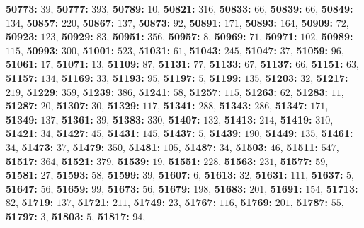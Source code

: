 \textsf{\bfseries 50773:} $39$, \textsf{\bfseries 50777:} $393$, \textsf{\bfseries 50789:} $10$, \textsf{\bfseries 50821:} $316$, \textsf{\bfseries 50833:} $66$, \textsf{\bfseries 50839:} $66$, \textsf{\bfseries 50849:} $134$, \textsf{\bfseries 50857:} $220$, \textsf{\bfseries 50867:} $137$, \textsf{\bfseries 50873:} $92$, \textsf{\bfseries 50891:} $171$, \textsf{\bfseries 50893:} $164$, \textsf{\bfseries 50909:} $72$, \textsf{\bfseries 50923:} $123$, \textsf{\bfseries 50929:} $83$, \textsf{\bfseries 50951:} $356$, \textsf{\bfseries 50957:} $8$, \textsf{\bfseries 50969:} $71$, \textsf{\bfseries 50971:} $102$, \textsf{\bfseries 50989:} $115$, \textsf{\bfseries 50993:} $300$, \textsf{\bfseries 51001:} $523$, \textsf{\bfseries 51031:} $61$, \textsf{\bfseries 51043:} $245$, \textsf{\bfseries 51047:} $37$, \textsf{\bfseries 51059:} $96$, \textsf{\bfseries 51061:} $17$, \textsf{\bfseries 51071:} $13$, \textsf{\bfseries 51109:} $87$, \textsf{\bfseries 51131:} $77$, \textsf{\bfseries 51133:} $67$, \textsf{\bfseries 51137:} $66$, \textsf{\bfseries 51151:} $63$, \textsf{\bfseries 51157:} $134$, \textsf{\bfseries 51169:} $33$, \textsf{\bfseries 51193:} $95$, \textsf{\bfseries 51197:} $5$, \textsf{\bfseries 51199:} $135$, \textsf{\bfseries 51203:} $32$, \textsf{\bfseries 51217:} $219$, \textsf{\bfseries 51229:} $359$, \textsf{\bfseries 51239:} $386$, \textsf{\bfseries 51241:} $58$, \textsf{\bfseries 51257:} $115$, \textsf{\bfseries 51263:} $62$, \textsf{\bfseries 51283:} $11$, \textsf{\bfseries 51287:} $20$, \textsf{\bfseries 51307:} $30$, \textsf{\bfseries 51329:} $117$, \textsf{\bfseries 51341:} $288$, \textsf{\bfseries 51343:} $286$, \textsf{\bfseries 51347:} $171$, \textsf{\bfseries 51349:} $137$, \textsf{\bfseries 51361:} $39$, \textsf{\bfseries 51383:} $330$, \textsf{\bfseries 51407:} $132$, \textsf{\bfseries 51413:} $214$, \textsf{\bfseries 51419:} $310$, \textsf{\bfseries 51421:} $34$, \textsf{\bfseries 51427:} $45$, \textsf{\bfseries 51431:} $145$, \textsf{\bfseries 51437:} $5$, \textsf{\bfseries 51439:} $190$, \textsf{\bfseries 51449:} $135$, \textsf{\bfseries 51461:} $34$, \textsf{\bfseries 51473:} $37$, \textsf{\bfseries 51479:} $350$, \textsf{\bfseries 51481:} $105$, \textsf{\bfseries 51487:} $34$, \textsf{\bfseries 51503:} $46$, \textsf{\bfseries 51511:} $547$, \textsf{\bfseries 51517:} $364$, \textsf{\bfseries 51521:} $379$, \textsf{\bfseries 51539:} $19$, \textsf{\bfseries 51551:} $228$, \textsf{\bfseries 51563:} $231$, \textsf{\bfseries 51577:} $59$, \textsf{\bfseries 51581:} $27$, \textsf{\bfseries 51593:} $58$, \textsf{\bfseries 51599:} $39$, \textsf{\bfseries 51607:} $6$, \textsf{\bfseries 51613:} $32$, \textsf{\bfseries 51631:} $111$, \textsf{\bfseries 51637:} $5$, \textsf{\bfseries 51647:} $56$, \textsf{\bfseries 51659:} $99$, \textsf{\bfseries 51673:} $56$, \textsf{\bfseries 51679:} $198$, \textsf{\bfseries 51683:} $201$, \textsf{\bfseries 51691:} $154$, \textsf{\bfseries 51713:} $82$, \textsf{\bfseries 51719:} $137$, \textsf{\bfseries 51721:} $211$, \textsf{\bfseries 51749:} $23$, \textsf{\bfseries 51767:} $116$, \textsf{\bfseries 51769:} $201$, \textsf{\bfseries 51787:} $55$, \textsf{\bfseries 51797:} $3$, \textsf{\bfseries 51803:} $5$, \textsf{\bfseries 51817:} $94$, 
